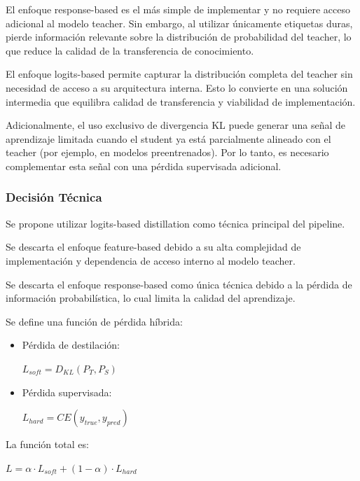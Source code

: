 \documentclass[12pt]{article}
\begin{document}
	El enfoque response-based es el más simple de implementar y no requiere acceso adicional al modelo teacher. Sin embargo, al utilizar únicamente etiquetas duras, pierde información relevante sobre la distribución de probabilidad del teacher, lo que reduce la calidad de la transferencia de conocimiento.
	
	El enfoque logits-based permite capturar la distribución completa del teacher sin necesidad de acceso a su arquitectura interna. Esto lo convierte en una solución intermedia que equilibra calidad de transferencia y viabilidad de implementación.
	
	Adicionalmente, el uso exclusivo de divergencia KL puede generar una señal de aprendizaje limitada cuando el student ya está parcialmente alineado con el teacher (por ejemplo, en modelos preentrenados). Por lo tanto, es necesario complementar esta señal con una pérdida supervisada adicional.
	

	
	\subsubsection{Decisión Técnica}
	
	Se propone utilizar logits-based distillation como técnica principal del pipeline.
	
	Se descarta el enfoque feature-based debido a su alta complejidad de implementación y dependencia de acceso interno al modelo teacher.
	
	Se descarta el enfoque response-based como única técnica debido a la pérdida de información probabilística, lo cual limita la calidad del aprendizaje.
	
	Se define una función de pérdida híbrida:
	
	\begin{itemize}
		\item Pérdida de destilación:
		\begin{center}
			$L_{soft} = D_{KL}(P_T, P_S)$
		\end{center}
		
		\item Pérdida supervisada:
		\begin{center}
			$L_{hard} = CE(y_{true}, y_{pred})$
		\end{center}
	\end{itemize}
	
	La función total es:
	
	\begin{center}
		$L = \alpha \cdot L_{soft} + (1 - \alpha) \cdot L_{hard}$
	\end{center}
	
\end{document}
